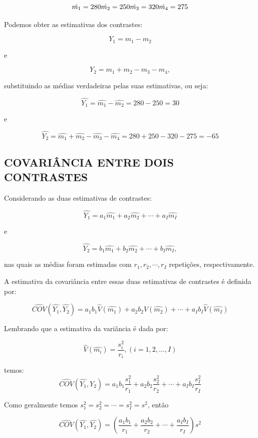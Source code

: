 \documentclass[
]{book}
\begin{document}
\[
\hat{m_1}=280 \\
\hat{m_2}=250 \\
\hat{m_3}=320 \\
\hat{m_4}=275
\]

Podemos obter as estimativas dos contrastes:

\[
Y_1=m_1-m_2
\]

e

\[
Y_2=m_1+m_2-m_3-m_4,
\]

substituindo as médias verdadeiras pelas suas estimativas, ou seja:

\[
\hat{Y_1}=\hat{m_1}-\hat{m_2} = 280-250=30
\]

e

\[
\hat{Y_2}=\hat{m_1}+\hat{m_2}-\hat{m_3}-\hat{m_4} = 280+250-320-275 = -65
\]

\hypertarget{covariuxe2ncia-entre-dois-contrastes}{%
\subsection{COVARIÂNCIA ENTRE DOIS CONTRASTES}\label{covariuxe2ncia-entre-dois-contrastes}}

Considerando as duas estimativas de contrastes:

\[
\hat{Y_1}=a_1 \hat{m_1} + a_2\hat{m_2} + \cdots + a_I \hat{m_I}
\]

e

\[
\hat{Y_2}=b_1 \hat{m_1} + b_2\hat{m_2} + \cdots + b_I \hat{m_I},
\]

nas quais as médias foram estimadas com \(r_1, r_2, \cdots, r_I\) repetições, respectivamente.

A estimativa da covariância entre essas duas estimativas de contrastes é definida por:

\[
\hat{COV}(\hat{Y_1},\hat{Y_2}) = a_1 b_1 \hat{V}(\hat{m_1})+a_2 b_2 \hat{V}(\hat{m_2}) + \cdots + a_I b_I \hat{V}(\hat{m_I})
\]

Lembrando que a estimativa da variância é dada por:

\[
\hat{V}(\hat{m_i}) = \frac{s^2_i}{r_i}, (i = 1,2,\dots,I)
\]

temos:
\[
\hat{COV}(\hat{Y_1},\hat{Y_2}) = a_1 b_1 \frac{s^2_1}{r_1}+a_2 b_2 \frac{s^2_2}{r_2} + \cdots + a_I b_I \frac{s^2_I}{r_I}
\]

Como geralmente temos \(s_1^2 = s_2^2 = \cdots =s_I^2=s^2\), então

\[
\hat{COV}(\hat{Y_1},\hat{Y_2}) = \left( \frac{a_1b_1}{r_1} + \frac{a_2b_2}{r_2} + \cdots + \frac{a_Ib_I}{r_I} \right) s^2
\]
\end{document}
